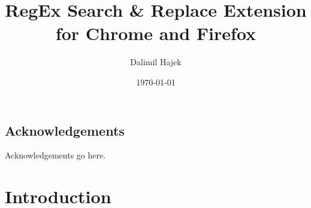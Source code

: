 \documentclass[bsc,frontabs,twoside,singlespacing,parskip,deptreport]{infthesis}
\begin{document}
\title{RegEx Search \& Replace Extension for Chrome and Firefox}

\author{Dalimil Hajek}

\date{\today}


\maketitle

\section*{Acknowledgements}
Acknowledgements go here. 

\tableofcontents

\chapter{Introduction}




\end{document}
